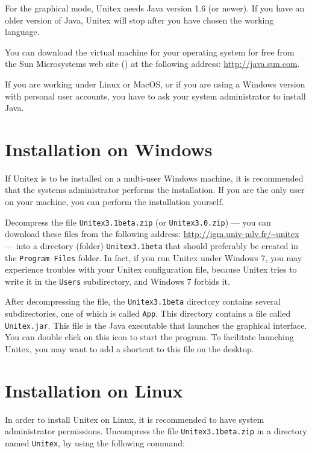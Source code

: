\bigskip
\noindent For the graphical mode, Unitex needs Java version 1.6 (or newer). If you have an
older version of Java, Unitex will stop after you have chosen the working
language.

\bigskip
\noindent You can download the virtual machine for your operating system for free from the
Sun Microsystems web site (\cite{site-java}) at the following address:
\url{http://java.sun.com}.

\bigskip
\noindent If you are working under Linux or MacOS, or if you are using a Windows version
with personal user accounts, you have to ask your system administrator to install
Java.


\section{Installation on Windows}
If Unitex is to be installed on a multi-user Windows machine, it is recommended
that the systems administrator performs the installation. If you are the only
user on your machine, you can perform the installation  yourself.

\bigskip
\noindent Decompress the file  \verb+Unitex3.1beta.zip+
(or \verb+Unitex3.0.zip+) --- you
can download these files from the following address:
\url{http://igm.univ-mlv.fr/~unitex} --- into a directory (folder) \verb+Unitex3.1beta+ that
should preferably be created in the \verb+Program Files+ folder. In fact, if you
run Unitex under Windows 7, you may experience troubles with your Unitex configuration
file, because Unitex tries to write it in the \verb+Users+ subdirectory, and Windows 7
forbids it.

\bigskip
\noindent After decompressing the file, the \verb+Unitex3.1beta+ directory contains several
subdirectories,  one  of which is called \verb+App+. This directory contains a
file called \verb+Unitex.jar+.  This file is the
Java executable that launches the graphical interface. You can double click on
this icon to start the program. To facilitate launching Unitex, you may want to
add a shortcut to this file on the desktop.




\section{Installation on Linux}
In order to install Unitex on Linux, it is recommended to have system
administrator permissions. Uncompress the file \verb+Unitex3.1beta.zip+ in a
directory named \verb+Unitex+, by using the following command:


